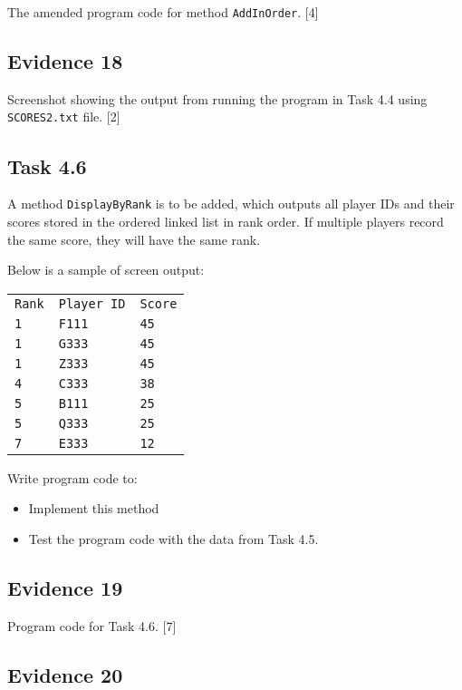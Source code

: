 The amended program code for method \texttt{AddInOrder}. \hfill{}{[}4{]}

\subsection*{Evidence 18}

Screenshot showing the output from running the program in Task 4.4
using \texttt{SCORES2.txt} file. \hfill{}{[}2{]}

\subsection*{Task 4.6 }

A method \texttt{DisplayByRank} is to be added, which outputs all
player IDs and their scores stored in the ordered linked list in rank
order. If multiple players record the same score, they will have the
same rank. 

Below is a sample of screen output:
\noindent \begin{center}
\begin{tabular}{lll}
\texttt{Rank} & \texttt{Player ID} & \texttt{Score}\tabularnewline
\texttt{1} & \texttt{F111} & \texttt{45}\tabularnewline
\texttt{1} & \texttt{G333} & \texttt{45}\tabularnewline
\texttt{1} & \texttt{Z333} & \texttt{45}\tabularnewline
\texttt{4} & \texttt{C333} & \texttt{38}\tabularnewline
\texttt{5} & \texttt{B111} & \texttt{25}\tabularnewline
\texttt{5} & \texttt{Q333} & \texttt{25}\tabularnewline
\texttt{7} & \texttt{E333} & \texttt{12}\tabularnewline
\end{tabular}
\par\end{center}

Write program code to:
\begin{itemize}
\item Implement this method 
\item Test the program code with the data from Task 4.5.
\end{itemize}

\subsection*{Evidence 19 }

Program code for Task 4.6. \hfill{}{[}7{]}

\subsection*{Evidence 20}

